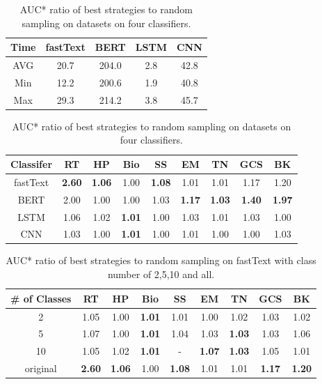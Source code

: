 \begin{table}
\parbox{.45\linewidth}{
	\small
	\centering

	\scriptsize
	\setlength{\abovecaptionskip}{0pt}
	\setlength{\belowcaptionskip}{0pt}
	\begin{tabular}{ccccc}
		\toprule
		Time & fastText & BERT & LSTM & CNN\\ \hline
		AVG & 20.7 & 204.0 & 2.8 & 42.8  \\
		Min & 12.2 & 200.6 & 1.9 & 40.8\\
		Max & 29.3  & 214.2 & 3.8  & 45.7\\
		\bottomrule  
	\end{tabular}
	\caption{Training time on 3000 samples of four classifiers. \emph{AVG, Min, Max} is the average/minimum/maximum training time over 8 datasets. The values are in \emph{seconds}.}
	\label{table:trainingtime}	
}
\hfill
\parbox{.5\linewidth}{
    \centering
    \small
    \scriptsize
    \setlength{\abovecaptionskip}{0pt}
    \setlength{\belowcaptionskip}{0pt}
    \begin{tabular}{ccccccccc}
    	\toprule
    	Classifer & RT & HP & Bio & SS & EM & TN & GCS & BK\\ \hline
    	fastText & \textbf{2.60} & \textbf{1.06} & 1.00 & \textbf{1.08} & 1.01 & 1.01 & 1.17 & 1.20\\
    	BERT & 2.00 & 1.00 & 1.00 & 1.03 & \textbf{1.17} & \textbf{1.03} & \textbf{1.40} & \textbf{1.97}\\ 
    	LSTM & 1.06 & 1.02 & \textbf{1.01} & 1.00 & 1.03 & 1.01 & 1.03 & 1.00\\
    	CNN & 1.03 & 1.00 & \textbf{1.01} & 1.00 & 1.01 & 1.00 & 1.00 & 1.03\\		
    	\bottomrule              
    \end{tabular}
    \caption{AUC* ratio of best strategies to random sampling on datasets on four classifiers.}
    \label{table:ratioOfClassifiers}
}
\end{table}

\begin{table}[!th]
		\centering
		\small
		\scriptsize
		\setlength{\abovecaptionskip}{0pt}
		\setlength{\belowcaptionskip}{0pt}
		\begin{tabular}{ccccccccc}
			\toprule
			\# of Classes  & RT & HP & Bio & SS & EM & TN & GCS & BK \\ \hline
			2  & 1.05  & 1.00 & \textbf{1.01} & 1.01 & 1.00 & 1.02  & 1.03 & 1.02\\
			5   & 1.07 & 1.00 & \textbf{1.01} & 1.04 & 1.03 & \textbf{1.03} & 1.03 & 1.06\\
			10 & 1.05 & 1.02 & \textbf{1.01} & - & \textbf{1.07} & \textbf{1.03}  & 1.05  &  1.01\\
			original  & \textbf{2.60} & \textbf{1.06} & 1.00 & \textbf{1.08} & 1.01 & 1.01  & \textbf{1.17}  & \textbf{1.20}\\ 
			\bottomrule              
		\end{tabular}
		\caption{AUC* ratio of best strategies to random sampling on fastText with class number of 2,5,10 and all.}
		\label{table:ratioOfDataset}
\end{table}



